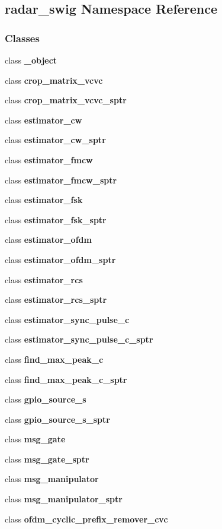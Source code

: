 \subsection{radar\+\_\+swig Namespace Reference}
\label{namespaceradar__swig}
\subsubsection*{Classes}
\begin{DoxyCompactItemize}
\item 
class {\bf \+\_\+object}
\item 
class {\bf crop\+\_\+matrix\+\_\+vcvc}
\item 
class {\bf crop\+\_\+matrix\+\_\+vcvc\+\_\+sptr}
\item 
class {\bf estimator\+\_\+cw}
\item 
class {\bf estimator\+\_\+cw\+\_\+sptr}
\item 
class {\bf estimator\+\_\+fmcw}
\item 
class {\bf estimator\+\_\+fmcw\+\_\+sptr}
\item 
class {\bf estimator\+\_\+fsk}
\item 
class {\bf estimator\+\_\+fsk\+\_\+sptr}
\item 
class {\bf estimator\+\_\+ofdm}
\item 
class {\bf estimator\+\_\+ofdm\+\_\+sptr}
\item 
class {\bf estimator\+\_\+rcs}
\item 
class {\bf estimator\+\_\+rcs\+\_\+sptr}
\item 
class {\bf estimator\+\_\+sync\+\_\+pulse\+\_\+c}
\item 
class {\bf estimator\+\_\+sync\+\_\+pulse\+\_\+c\+\_\+sptr}
\item 
class {\bf find\+\_\+max\+\_\+peak\+\_\+c}
\item 
class {\bf find\+\_\+max\+\_\+peak\+\_\+c\+\_\+sptr}
\item 
class {\bf gpio\+\_\+source\+\_\+s}
\item 
class {\bf gpio\+\_\+source\+\_\+s\+\_\+sptr}
\item 
class {\bf msg\+\_\+gate}
\item 
class {\bf msg\+\_\+gate\+\_\+sptr}
\item 
class {\bf msg\+\_\+manipulator}
\item 
class {\bf msg\+\_\+manipulator\+\_\+sptr}
\item 
class {\bf ofdm\+\_\+cyclic\+\_\+prefix\+\_\+remover\+\_\+cvc}

\end{DoxyCompactItemize}
